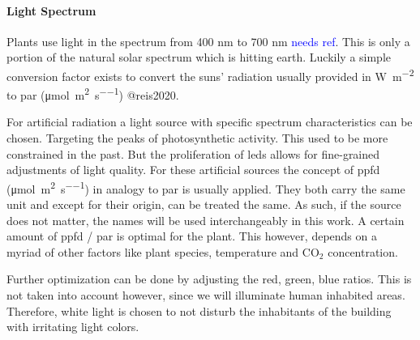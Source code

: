 \paragraph{Light Spectrum}
Plants use light in the spectrum from 400 nm to 700 nm \textcolor{Blue}{needs ref}.
This is only a portion of the natural solar spectrum which is hitting earth.
Luckily a simple conversion factor exists to convert the suns' radiation usually provided in \si{\W\per\square\m} to \ac{par} (\si{\umol\per\square\m\per\s}) @reis2020.

For artificial radiation a light source with specific spectrum characteristics can be chosen. %
Targeting the peaks of photosynthetic activity.
This used to be more constrained in the past.
But the proliferation of \acsp{led} allows for fine-grained adjustments of light quality.
For these artificial sources the concept of \ac{ppfd} (\si{\umol\per\square\m\per\s}) in analogy to \ac{par} is usually applied.
They both carry the same unit and except for their origin, can be treated the same.
As such, if the source does not matter, the names will be used interchangeably in this work.
A certain amount of \ac{ppfd} / \ac{par} is optimal for the plant.
This however, depends on a myriad of other factors like plant species, temperature and CO$_2$ concentration.

Further optimization can be done by adjusting the red, green, blue ratios.
This is not taken into account however, since we will illuminate human inhabited areas.
Therefore, white light is chosen to not disturb the inhabitants of the building with irritating light colors.

